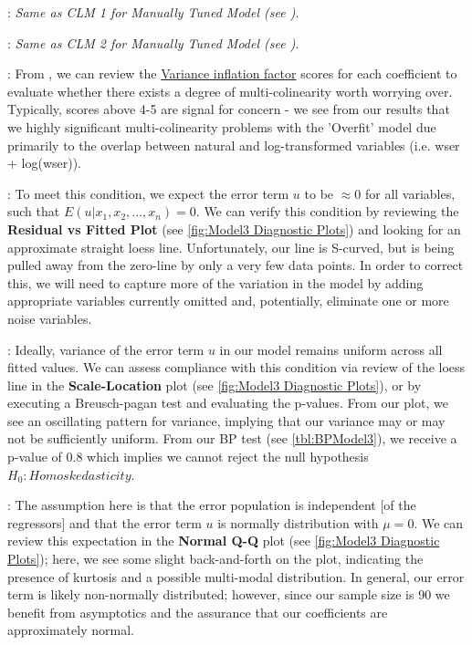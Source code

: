 \begin{description}[font=$\bullet$~\normalfont\scshape\small\color{red!50!black}]
	\item [CLM 1 - Linear in parameters] {\fontsize{10}{10} \selectfont : \textit{Same as CLM 1 for Manually Tuned Model (see )}.}
	\item [CLM 2 - Random sampling] {\fontsize{10}{10} \selectfont : \textit{Same as CLM 2 for Manually Tuned Model (see )}.}
	\item [CLM 3 - No perfect multi-colinearity] {\fontsize{10}{10} \selectfont : From , we can review the \href{https://en.wikipedia.org/wiki/Variance_inflation_factor}{Variance inflation factor} scores for each coefficient to evaluate whether there exists a degree of multi-colinearity worth worrying over.  Typically, scores above 4-5 are signal for concern - we see from our results that we highly significant multi-colinearity problems with the 'Overfit' model due primarily to the overlap between natural and log-transformed variables (i.e. wser + log(wser)).}
	\item [CLM 4 - Zero-conditional mean] {\fontsize{10}{10} \selectfont : To meet this condition, we expect the error term $u$ to be $\approx 0$ for all variables, such that $E(u|x_1,x_2,...,x_n) = 0$.  We can verify this condition by reviewing the \textbf{Residual vs Fitted Plot} (see \ref{fig:Model3 Diagnostic Plots}) and looking for an approximate straight loess line.  Unfortunately, our line is S-curved, but is being pulled away from the zero-line by only a very few data points.  In order to correct this, we will need to capture more of the variation in the model by adding appropriate variables currently omitted and, potentially, eliminate one or more noise variables.}
	\item [CLM 5 - Homoskedasticity] {\fontsize{10}{10} \selectfont : Ideally, variance of the error term $u$ in our model remains uniform across all fitted values.  We can assess compliance with this condition via review of the loess line in the \textbf{Scale-Location} plot (see \ref{fig:Model3 Diagnostic Plots}), or by executing a Breusch-pagan test and evaluating the p-values.  From our plot, we see an oscillating pattern for variance, implying that our variance may or may not be sufficiently uniform.  From our BP test (see \ref{tbl:BPModel3}), we receive a p-value of 0.8 which implies we cannot reject the null hypothesis $H_0 : Homoskedasticity$.}
	\item [CLM 6 - Normality] {\fontsize{10}{10} \selectfont : The assumption here is that the error population is independent [of the regressors] and that the error term $u$ is normally distribution with $\mu = 0$.  We can review this expectation in the \textbf{Normal Q-Q} plot (see \ref{fig:Model3 Diagnostic Plots}); here, we see some slight back-and-forth on the plot, indicating the presence of kurtosis and a possible multi-modal distribution.  In general, our error term is likely non-normally distributed; however, since our sample size is 90 we benefit from asymptotics and the assurance that our coefficients are approximately normal.}
\end{description}

